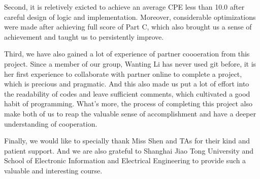 \documentclass{article}
\begin{document}
Second, it is reletively exicted to achieve an average CPE less than 10.0 after careful design of logic and implementation. Moreover, considerable optimizations were made after achieving full score of Part C, which also brought us a sense of achievement and taught us to persistently improve.

Third, we have also gained a lot of experience of partner coooeration from this project. Since a member of our group, Wanting Li has never used git before, it is her first experience to collaborate with partner online to complete a project, which is precious and pragmatic. And this also made us put a lot of effort into the readability of codes and leave sufficient comments, which cultivated a good habit of programming. What's more, the process of completing this project also make both of us to reap the valuable sense of accomplishment and have a deeper understanding of cooperation.

Finally, we would like to specially thank Miss Shen and TAs for their kind and patient support. And we are also grateful to Shanghai Jiao Tong University and School of Electronic Information and Electrical Engineering to provide such a valuable and interesting course.


\end{document}
